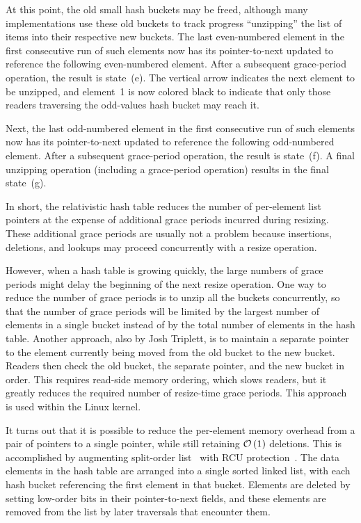 At this point, the old small hash buckets may be freed, although many
implementations use these old buckets to track progress ``unzipping''
the list of items into their respective new buckets.
The last even-numbered element in the first consecutive run of such
elements now has its pointer-to-next updated to reference the following
even-numbered element.
After a subsequent grace-period operation, the result is state~(e).
The vertical arrow indicates the next element to be unzipped, and
element~1 is now colored black to indicate that only those readers traversing
the odd-values hash bucket may reach it.

Next, the last odd-numbered element in the first consecutive run of such
elements now has its pointer-to-next updated to reference the following
odd-numbered element.
After a subsequent grace-period operation, the result is state~(f).
A final unzipping operation (including a grace-period operation)
results in the final state~(g).

In short, the relativistic hash table reduces the number of per-element
list pointers at the expense of additional grace periods incurred during
resizing.
These additional grace periods are usually not a problem because
insertions, deletions, and lookups may proceed concurrently with
a resize operation.

However, when a hash table is growing quickly, the large numbers of
grace periods might delay the beginning of the next resize operation.
One way to reduce the number of grace periods is to unzip all the
buckets concurrently, so that the number of grace periods will be
limited by the largest number of elements in a single bucket instead
of by the total number of elements in the hash table.
Another approach, also by Josh Triplett, is to maintain a separate
pointer to the element currently being moved from the old bucket to
the new bucket.
Readers then check the old bucket, the separate pointer, and the new
bucket in order.
This requires read-side memory ordering, which slows readers, but
it greatly reduces the required number of resize-time grace periods.
This approach is used within the Linux kernel.

It turns out that it is possible to reduce the per-element memory overhead
from a pair of pointers to a single pointer, while still retaining
$\mathcal{O}\left(1\right)$ deletions.
This is accomplished by augmenting split-order
list~\cite{OriShalev2006SplitOrderListHash}
with RCU
protection~\cite{MathieuDesnoyers2009URCU,PaulMcKenney2013LWNURCUhash}.
The data elements in the hash table are arranged into a single
sorted linked list, with each hash bucket referencing the first element
in that bucket.
Elements are deleted by setting low-order bits in their pointer-to-next
fields, and these elements are removed from the list by later traversals
that encounter them.

